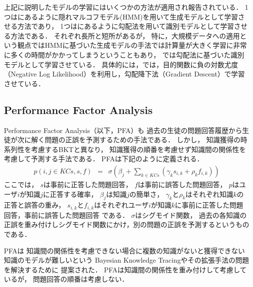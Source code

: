上記に説明したモデルの学習にはいくつかの方法が適用され報告されている．
1つは\cite{corbett1994knowledge}にあるように隠れマルコフモデル(HMM)を用いて生成モデルとして学習させる方法であり，
1つは\cite{yudelson2013individualized}にあるように勾配法を用いて識別モデルとして学習させる方法である．
それぞれ長所と短所があるが，
特に，大規模データへの適用という観点ではHMMに基づいた生成モデルの手法では計算量が大きく学習に非常に多くの時間がかかってしまうということもあり，
\cite{yudelson2013individualized}では勾配法に基づいた識別モデルとして学習させている．
具体的には，\cite{yudelson2013individualized}では，目的関数に負の対数尤度（Negative Log Likelihood）を利用し，勾配降下法（Gradient Descent）で学習させている．



\subsection{Performance Factor Analysis}
Performance Factor Analysis\cite{pavlik2009performance}（以下，PFA）も
過去の生徒の問題回答履歴から生徒が次に解く問題の正誤を予測するための手法である．
しかし，
知識獲得の時系列性を考慮するBKTと異なり，
知識獲得の順番を考慮せず知識間の関係性を考慮して予測する手法である．
PFAは下記のように定義される．
\begin{eqnarray}
	p(i, j \in KCs, s, f) & = & \sigma( \beta _j + \sum_{k \in KCs}(\gamma_k s_{i, k} + \rho _k f_{i, k}) )
\end{eqnarray}
ここでは，
$s$は事前に正答した問題回答，
$f$は事前に誤答した問題回答，
$p$はユーザ$i$が知識$j$に正答する確率，
$\beta_j$は知識$j$の簡単さ，
$\gamma_k$と$\rho_k$はそれぞれ知識$k$の正答と誤答の重み，
$s_{i, k}$と$f_{i, k}$はそれぞれユーザ$i$が知識$k$に事前に正答した問題回答，事前に誤答した問題回答
である．
$\sigma$はシグモイド関数，
過去の各知識の正誤を重み付けしシグモイド関数にかけ，別の問題の正誤を予測するというものである．

PFAは
知識間の関係性を考慮できない場合に複数の知識がないと獲得できない知識のモデルが難しいという
Bayesian Knowledge Tracingやその拡張手法の問題を解決するために
提案された．
PFAは知識間の関係性を重み付けして考慮しているが，
問題回答の順番は考慮しない．


